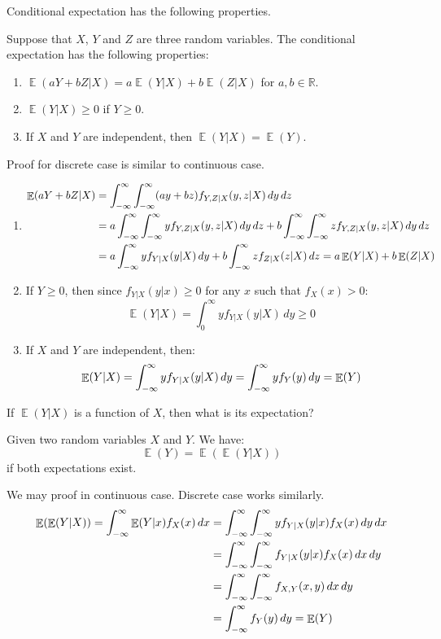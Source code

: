 \documentclass{huhtakm-template-book-v2}
\DeclareMathOperator{\E}{\mathbb{E}}
\begin{document}
Conditional expectation has the following properties.
\begin{lem}
	\label{Chapter 1 (Lemma) Properties of conditional expectation}
	Suppose that $X$, $Y$ and $Z$ are three random variables. The conditional expectation has the following properties:
	\begin{enumerate}
		\item $\E(aY+bZ|X)=a\E(Y|X)+b\E(Z|X)$ for $a,b\in\mathbb{R}$.
		\item $\E(Y|X)\geq 0$ if $Y\geq 0$.
		\item If $X$ and $Y$ are independent, then $\E(Y|X)=\E(Y)$.
	\end{enumerate}
\end{lem}
\begin{proofing}
	Proof for discrete case is similar to continuous case.
	\begin{enumerate}
		\item 
		\begin{align*}
			\E(aY+bZ|X)&=\intinfty\intinfty(ay+bz)f_{Y,Z|X}(y,z|X)\,dy\,dz\\
			&=a\intinfty\intinfty yf_{Y,Z|X}(y,z|X)\,dy\,dz+b\intinfty\intinfty zf_{Y,Z|X}(y,z|X)\,dy\,dz\\
			&=a\intinfty yf_{Y|X}(y|X)\,dy+b\intinfty zf_{Z|X}(z|X)\,dz=a\E(Y|X)+b\E(Z|X)
		\end{align*}
		\item If $Y\geq 0$, then since $f_{Y|X}(y|x)\geq 0$ for any $x$ such that $f_{X}(x)>0$:
		\begin{equation*}
			\E(Y|X)=\int_{0}^{\infty}yf_{Y|X}(y|X)\,dy\geq 0
		\end{equation*} 
		\item If $X$ and $Y$ are independent, then:
		\begin{equation*}
			\E(Y|X)=\intinfty yf_{Y|X}(y|X)\,dy=\intinfty yf_{Y}(y)\,dy=\E(Y)
		\end{equation*}
	\end{enumerate}
\end{proofing}
If $\E(Y|X)$ is a function of $X$, then what is its expectation?
\begin{thm}
	Given two random variables $X$ and $Y$. We have:
	\begin{equation*}
		\E(Y)=\E(\E(Y|X))
	\end{equation*}
	if both expectations exist. 
\end{thm}
\begin{proofing}
	We may proof in continuous case. Discrete case works similarly.
	\begin{align*}
		\E(\E(Y|X))=\intinfty\E(Y|x)f_{X}(x)\,dx&=\intinfty\intinfty y f_{Y|X}(y|x)f_{X}(x)\,dy\,dx\\
		&=\intinfty\intinfty f_{Y|X}(y|x)f_{X}(x)\,dx\,dy\\
		&=\intinfty\intinfty f_{X,Y}(x,y)\,dx\,dy\\
		&=\intinfty f_{Y}(y)\,dy=\E(Y)
	\end{align*}
\end{proofing}
\end{document}
